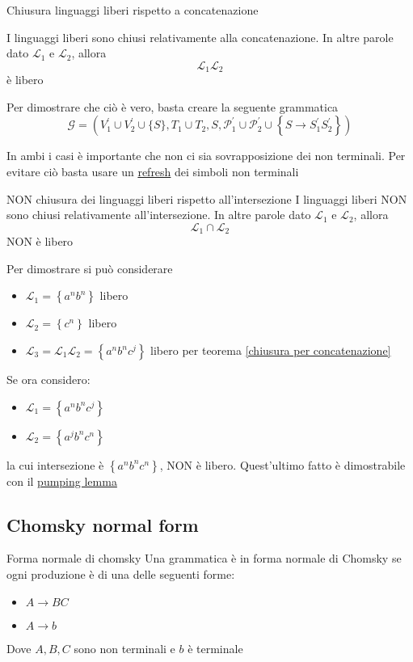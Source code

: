 \begin{teorema}{Chiusura linguaggi liberi rispetto a concatenazione}\label{chiusura per concatenazione}

	I linguaggi liberi sono chiusi relativamente alla concatenazione. In altre parole dato $ \mathcal{L}_1 $ e $ \mathcal{L}_2 $, allora
	\[
		\mathcal{L}_1 \mathcal{L}_2
	\]
	è libero
\end{teorema}
Per dimostrare che ciò è vero, basta creare la seguente grammatica
\[
	\mathcal{G}=\left(V_1^{\prime} \cup V_2^{\prime} \cup\{S\}, T_1 \cup T_2, S, \mathcal{P}_1^{\prime} \cup \mathcal{P}_2^{\prime} \cup\left\{S \rightarrow S_1^{\prime}  S_2^{\prime}\right\}\right)
\]

In ambi i casi è importante che non ci sia sovrapposizione dei non terminali. Per evitare ciò basta usare un \underline{refresh} dei simboli non terminali

\begin{teorema}{NON chiusura dei linguaggi liberi rispetto all'intersezione}
	I linguaggi liberi NON sono chiusi relativamente all'intersezione. In altre parole dato $ \mathcal{L}_1 $ e $ \mathcal{L}_2 $, allora
	\[
		\mathcal{L}_1 \cap \mathcal{L}_2
	\]
	NON è libero
\end{teorema}
Per dimostrare si può considerare
\begin{itemize}
	\item $ \mathcal{L_1} = \left\{a^{n}b^{n}\right\} $ libero
	\item $ \mathcal{L_2} = \left\{c^{n}\right\} $ libero
	\item $ \mathcal{L}_3 = \mathcal{L}_1 \mathcal{L}_2 = \left\{a^{n}b^{n} c^{j}\right\}$ libero per teorema \ref{chiusura per concatenazione}
\end{itemize}
Se ora considero:
\begin{itemize}
	\item  $ \mathcal{L}_1 = \left\{a^{n}b^{n} c^{j}\right\}$
	\item  $ \mathcal{L}_2 = \left\{a^{j}b^{n}c^{n}\right\}$
\end{itemize}
la cui intersezione è $ \left\{a^{n}b^{n}c^{n}\right\} $, NON è libero. Quest'ultimo fatto è dimostrabile con il \hyperref[pumping lemma]{pumping lemma}


\subsection{Chomsky normal form}\label{chomsky normal form}
\begin{definizione}{Forma normale di chomsky}
	Una grammatica è in forma normale di Chomsky se ogni produzione è di una delle seguenti forme:
	\begin{itemize}
		\item $ A \rightarrow BC $
		\item $ A \rightarrow b $
	\end{itemize}
	Dove $ A, B, C $ sono non terminali e $ b $ è terminale
\end{definizione}
